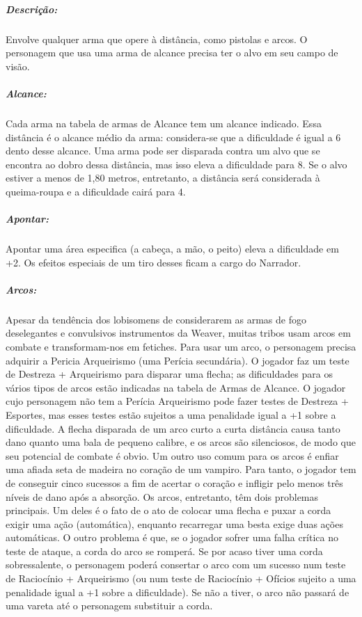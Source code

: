 
\subparagraph*{\bf Descrição:} Envolve qualquer arma que opere à distância, como pistolas e arcos. O personagem que usa uma arma de alcance precisa ter o alvo em seu campo de visão.

\subparagraph{\bf Alcance:}

Cada arma na tabela de armas de Alcance tem um alcance indicado. Essa distância é o alcance médio da arma: considera-se que a dificuldade é igual a 6 dento desse alcance. Uma arma pode ser disparada contra um alvo que se encontra ao dobro dessa distância, mas isso eleva a dificuldade para 8. Se o alvo estiver a menos de 1,80 metros, entretanto, a distância será considerada à queima-roupa e a dificuldade cairá para 4.

\subparagraph{\bf Apontar:}
Apontar uma área especifica (a cabeça, a mão, o peito) eleva a dificuldade em +2. Os efeitos especiais de um tiro desses ficam a cargo do Narrador.

\subparagraph{\bf Arcos:} 
Apesar da tendência dos lobisomens de considerarem as armas de fogo deselegantes e convulsivos instrumentos da Weaver, muitas tribos usam arcos em combate e transformam-nos em fetiches. Para usar um arco, o personagem precisa adquirir a Pericia Arqueirismo (uma Perícia secundária). O jogador faz um teste de Destreza + Arqueirismo para disparar uma flecha; as dificuldades para os vários tipos de arcos estão indicadas na tabela de Armas de Alcance. O jogador cujo personagem não tem a Perícia Arqueirismo pode fazer testes de Destreza + Esportes, mas esses testes estão sujeitos a uma penalidade igual a +1 sobre a dificuldade.
A flecha disparada de um arco curto a curta distância causa tanto dano quanto uma bala de pequeno calibre, e os arcos são silenciosos, de modo que seu potencial de combate é obvio. Um outro uso comum para os arcos é enfiar uma afiada seta de madeira no coração de um vampiro. Para tanto, o jogador tem de conseguir cinco sucessos a fim de acertar o coração e infligir pelo menos três níveis de dano após a absorção.
Os arcos, entretanto, têm dois problemas principais. Um deles é o fato de o ato de colocar uma flecha e puxar a corda exigir uma ação (automática), enquanto recarregar uma besta exige duas ações automáticas. O outro problema é que, se o jogador sofrer uma falha crítica no teste de ataque, a corda do arco se romperá. Se por acaso tiver uma corda sobressalente, o personagem poderá consertar o arco com um sucesso num teste de Raciocínio + Arqueirismo (ou num teste de Raciocínio + Ofícios sujeito a uma penalidade igual a +1 sobre a dificuldade). Se não a tiver, o arco não passará de uma vareta até o personagem substituir a corda.

